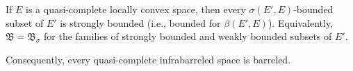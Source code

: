 If $E$ is a quasi-complete locally convex space, then every $\sigma(E', E)$-bounded subset of $E'$ is strongly bounded (i.e., bounded for $\beta(E', E)$). Equivalently, $\mathfrak{B} = \mathfrak{B}_\sigma$ for the families of strongly bounded and weakly bounded subsets of $E'$.

Consequently, every quasi-complete infrabarreled space is barreled.
